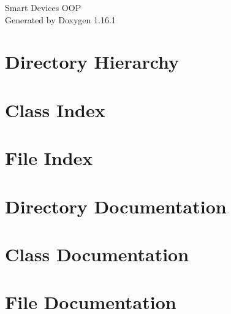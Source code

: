 \documentclass[twoside]{book}
\newcommand{\+}{\discretionary{\mbox{\scriptsize$\hookleftarrow$}}{}{}}
\newcommand{\clearemptydoublepage}{%
    \newpage{\pagestyle{empty}\cleardoublepage}%
  }
\begin{document}
  \raggedbottom
    \hypersetup{pageanchor=false,
                bookmarksnumbered=true,
                pdfencoding=unicode
               }
  \begin{titlepage}
  \vspace*{7cm}
  \begin{center}%
  {\Large Smart Devices OOP}\\
  \vspace*{1cm}
  {\large Generated by Doxygen 1.16.1}\\
  \end{center}
  \end{titlepage}
  \clearemptydoublepage
  \tableofcontents
  \clearemptydoublepage
  \hypersetup{pageanchor=true}
\chapter{Directory Hierarchy}

\chapter{Class Index}

\chapter{File Index}

\chapter{Directory Documentation}



\chapter{Class Documentation}


\chapter{File Documentation}









  \backmatter
  \newpage
  \clearemptydoublepage
  \printindex
\end{document}
